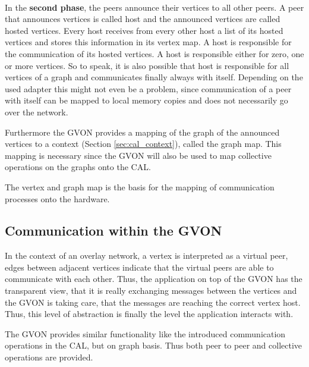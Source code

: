 \paragraph*{}
In the \textbf{second phase}, the peers announce their vertices to all other
peers.  A peer that announces vertices is called host and the
announced vertices are called hosted vertices.  Every host receives
from every other host a list of its hosted vertices and stores this
information in its vertex map. A host is responsible for the
communication of its hosted vertices. A host is responsible either for
zero, one or more vertices. So to speak, it is also possible that host
is responsible for all vertices of a graph and communicates finally
always with itself.  Depending on the used adapter this might not even
be a problem, since communication of a peer with itself can be mapped
to local memory copies and does not necessarily go over the network.

Furthermore the GVON provides a mapping of the graph of the announced
vertices to a context (Section \ref{sec:cal_context}), called the
graph map. This mapping is necessary since the GVON will also be used
to map collective operations on the graphs onto the CAL.

The vertex and graph map is the basis for the mapping of communication
processes onto the hardware.


\subsection{Communication within the GVON}
In the context of an overlay network, a vertex is interpreted as a
virtual peer, edges between adjacent vertices indicate that the
virtual peers are able to communicate with each other. Thus, the
application on top of the GVON has the transparent view, that it is
really exchanging messages between the vertices and the GVON is taking
care, that the messages are reaching the correct vertex host. Thus, 
this level of abstraction is finally the level the application
interacts with.

The GVON provides similar functionality like the introduced
communication operations in the CAL, but on graph basis. Thus both
peer to peer and collective operations are provided.

